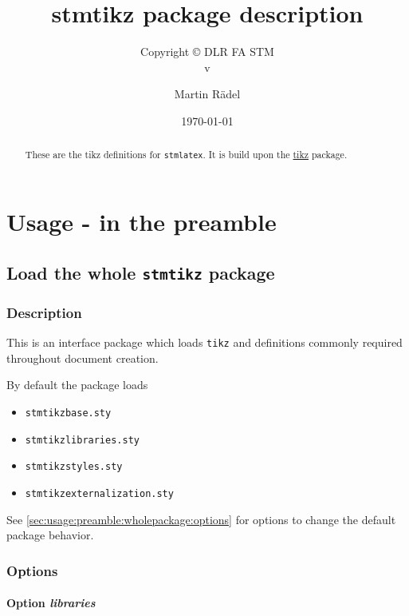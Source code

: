\documentclass[%
  type=article,%
  layout=koma,%
  date=true,%
  hyperref=true,%
  listings=true,%
  tikz=false,%
]{stmtext}
\author{Martin R\"{a}del}
\title{stmtikz package description}
\subtitle{Copyright \copyright{} \the\year{} DLR FA STM\\v\formatdate[versiondatestyle]{\DTMToday}}
\date{\today}
\begin{document}
\maketitle

\begin{abstract}
These are the tikz definitions for \texttt{stmlatex}. It is build upon the \href{https://ctan.org/pkg/tikz}{tikz} package.
\end{abstract}

\tableofcontents

\section{Usage - in the preamble}

\subsection{Load the whole \protect\texttt{stmtikz} package}

\subsubsection{Description}

This is an interface package which loads \texttt{tikz} and definitions commonly required throughout document creation.

By default the package loads

\begin{itemize}[noitemsep]
  \item \verb+stmtikzbase.sty+
  \item \verb+stmtikzlibraries.sty+
  \item \verb+stmtikzstyles.sty+
  \item \verb+stmtikzexternalization.sty+
\end{itemize}

See \autoref{sec:usage:preamble:wholepackage:options} for options to change the default package behavior.

\subsubsection{Options}
\label{sec:usage:preamble:wholepackage:options}

\paragraph{Option \protect\textit{libraries}} 
\label{sec:usage:preamble:wholepackage:options:libraries}
\end{document}
